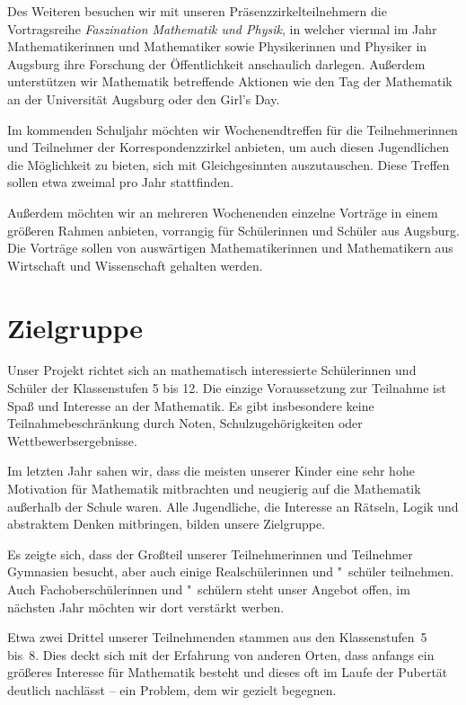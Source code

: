 \documentclass[12pt]{zettel}
\begin{document}
Des Weiteren besuchen wir mit unseren Präsenzzirkelteilnehmern die
Vortragsreihe \emph{Faszination Mathematik und Physik}, in welcher viermal im
Jahr Mathematikerinnen und Mathematiker sowie Physikerinnen und Physiker in Augsburg ihre Forschung der
Öffentlichkeit anschaulich darlegen. Außerdem unterstützen wir
Mathematik betreffende Aktionen wie den Tag der Mathematik an
der Universität Augsburg oder den Girl's Day.

Im kommenden Schuljahr möchten wir Wochenendtreffen für die Teilnehmerinnen und
Teilnehmer der Korrespondenzzirkel anbieten, um auch diesen Jugendlichen die
Möglichkeit zu bieten, sich mit Gleichgesinnten auszutauschen. Diese Treffen
sollen etwa zweimal pro Jahr stattfinden.

Außerdem möchten wir an mehreren Wochenenden einzelne Vorträge in einem
größeren Rahmen anbieten, vorrangig für Schülerinnen und Schüler aus Augsburg.
Die Vorträge sollen von auswärtigen Mathematikerinnen und Mathematikern aus
Wirtschaft und Wissenschaft gehalten werden.


\section{Zielgruppe}

Unser Projekt richtet sich an mathematisch interessierte Schülerinnen
und Schüler der Klassenstufen 5 bis 12. Die einzige Voraussetzung zur
Teilnahme ist Spaß und Interesse an der Mathematik. Es gibt insbesondere
keine Teilnahmebeschränkung durch Noten, Schulzugehörigkeiten oder
Wettbewerbsergebnisse.

Im letzten Jahr sahen wir, dass die meisten unserer Kinder eine
sehr hohe Motivation für Mathematik mitbrachten und neugierig auf die
Mathematik außerhalb der Schule waren. Alle Jugendliche, die Interesse an
Rätseln, Logik und abstraktem Denken mitbringen, bilden unsere
Zielgruppe.

Es zeigte sich, dass der Großteil unserer Teilnehmerinnen und
Teilnehmer Gymnasien besucht, aber auch einige Realschülerinnen und "~schüler teilnehmen.
Auch Fachoberschülerinnen und "~schülern steht unser Angebot offen, im nächsten
Jahr möchten wir dort verstärkt werben.

Etwa zwei Drittel unserer Teilnehmenden
stammen aus den Klassenstufen~5 bis~8.
Dies deckt sich mit der
Erfahrung von anderen Orten, dass anfangs ein größeres Interesse für
Mathematik besteht und dieses oft im Laufe der Pubertät
deutlich nachlässt -- ein Problem, dem wir gezielt begegnen.
\end{document}

